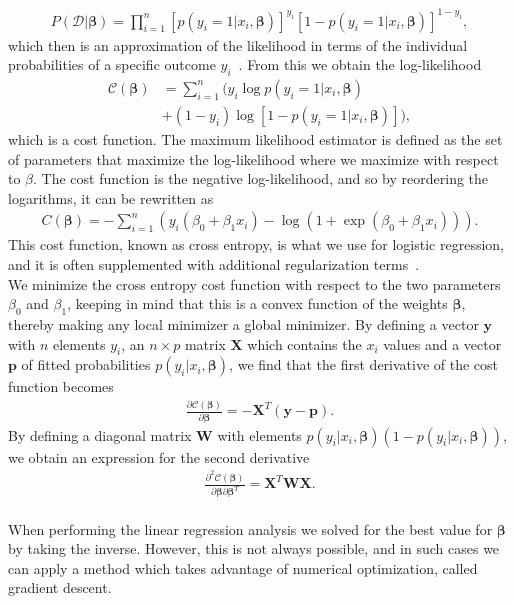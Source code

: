 \documentclass[english,notitlepage,reprint,nofootinbib]{revtex4-2}  %
\begin{document}
\begin{align}
    P(\mathcal{D}|\boldsymbol{\beta}) 
    = \prod\limits_{i=1}^n 
    [p(y_i=1|x_i,\boldsymbol{\beta})]^{y_i}
    [1 - p(y_i=1|x_i,\boldsymbol{\beta})]^{1-y_i}, 
\end{align}
which then is an approximation of the likelihood in terms of the individual probabilities of a specific outcome $y_i$~\cite{friedman}. 
From this we obtain the log-likelihood
\begin{align}
    \mathcal{C}(\boldsymbol{\beta}) 
    &= \sum\limits_{i=1}^n (y_i 
    \log p(y_i=1|x_i,\boldsymbol{\beta}) \nonumber \\ 
    &+ (1-y_i) 
    \log[1 - p(y_i=1|x_i,\boldsymbol{\beta})]), 
\end{align}
which is a cost function. 
The maximum likelihood estimator is defined as the set of parameters that maximize the log-likelihood where we maximize with respect to $\beta$. The cost function is the negative log-likelihood, and so by reordering the logarithms, it can be rewritten as 
\begin{align}\label{eq: cost function logistic regression}
    C(\boldsymbol{\beta}) = -\sum\limits_{i=1}^n (y_i(\beta_0 + \beta_1 x_i) - \log(1+\exp(\beta_0 + \beta_1 x_i))).
\end{align}
This cost function, known as cross entropy, is what we use for logistic regression, and it is often supplemented with additional regularization terms~\cite{friedman}. 
\vspace{3mm}
\\ 
We minimize the cross entropy cost function with respect to the two parameters $\beta_0$ and $\beta_1$, keeping in mind that this is a convex function of the weights $\boldsymbol{\beta}$, thereby making any local minimizer a global minimizer. By defining a vector $\boldsymbol{y}$ with $n$ elements $y_i$, an $n\times p$ matrix $\mathbf{X}$ which contains the $x_i$ values and a vector $\boldsymbol{p}$ of fitted probabilities $p(y_i | x_i, \boldsymbol{\beta})$, we find that the first derivative of the cost function becomes 
\begin{align}
    \frac{\partial \mathcal{C}(\boldsymbol{\beta})}{\partial \boldsymbol{\beta}} = -\boldsymbol{X}^T\left(\boldsymbol{y}-\boldsymbol{p}\right).
\end{align}
By defining a diagonal matrix $\mathbf{W}$ with elements $p(y_i | x_i, \boldsymbol{\beta})(1 - p(y_i | x_i, \boldsymbol{\beta}))$, we obtain an expression for the second derivative 
\begin{align}
    \frac{\partial^2 \mathcal{C}(\boldsymbol{\beta})}{\partial \boldsymbol{\beta}\partial \boldsymbol{\beta}^T} = \boldsymbol{X}^T\boldsymbol{W}\boldsymbol{X}.
\end{align}
\vspace{3mm}
\\ 
When performing the linear regression analysis we solved for the best value for $\boldsymbol{\beta}$ by taking the inverse. However, this is not always possible, and in such cases we can apply a method which takes advantage of numerical optimization, called gradient descent. 
\end{document}
